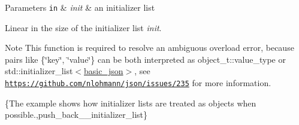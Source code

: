 \begin{DoxyParams}[1]{Parameters}
\mbox{\tt in}  & {\em init} & an initializer list\\
\hline
\end{DoxyParams}
Linear in the size of the initializer list {\itshape init}.

\begin{DoxyNote}{Note}
This function is required to resolve an ambiguous overload error, because pairs like {\ttfamily \{\char`\"{}key\char`\"{}, \char`\"{}value\char`\"{}\}} can be both interpreted as {\ttfamily object\+\_\+t\+::value\+\_\+type} or {\ttfamily std\+::initializer\+\_\+list$<$\hyperlink{classnlohmann_1_1basic__json}{basic\+\_\+json}$>$}, see \href{https://github.com/nlohmann/json/issues/235}{\tt https\+://github.\+com/nlohmann/json/issues/235} for more information.
\end{DoxyNote}
\{The example shows how initializer lists are treated as objects when possible.,push\+\_\+back\+\_\+\+\_\+initializer\+\_\+list\} 
